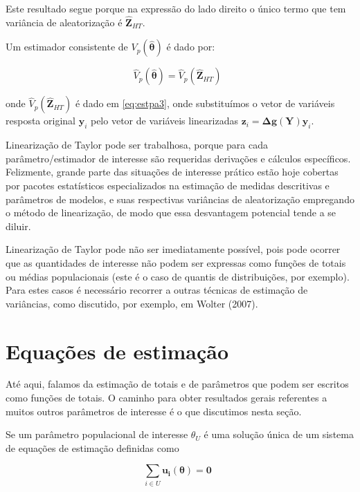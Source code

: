 \documentclass[
  12pt,
  brazilian,
]{book}
\theoremstyle{definition}
\theoremstyle{definition}
\theoremstyle{definition}
\theoremstyle{definition}
\theoremstyle{remark}
\begin{document}
Este resultado segue porque na expressão do lado direito o único termo que tem variância de aleatorização é \(\mathbf{\widehat{Z}}_{HT}\).

Um estimador consistente de \(V_{p} \left( \mathbf{\widehat{\theta}}\right)\) é dado por:

\begin{equation}
\widehat{V}_{p} \left( \mathbf{\widehat{\theta}} \right) = \widehat{V}_{p} \left( \mathbf{\widehat{Z}}_{HT} \right)  \,\,\,  \label{eq:estpa20}
\end{equation}

onde \(\widehat{V}_{p}\left( \mathbf{\widehat{Z}}_{HT}\right)\) é dado em \eqref{eq:estpa3}, onde substituímos o vetor de variáveis resposta original \(\mathbf{y}_i\) pelo vetor de variáveis linearizadas \(\mathbf{z}_{i} = \mathbf{\Delta g(Y)} \mathbf{y}_{i}\).

Linearização de Taylor pode ser trabalhosa, porque para cada parâmetro/estimador de interesse são requeridas derivações e cálculos específicos. Felizmente, grande parte das situações de interesse prático estão hoje cobertas por pacotes estatísticos especializados na estimação de medidas descritivas e parâmetros de modelos, e suas respectivas variâncias de aleatorização empregando o método de linearização, de modo que essa desvantagem potencial tende a se diluir.

Linearização de Taylor pode não ser imediatamente possível, pois pode ocorrer que as quantidades de interesse não podem ser expressas como funções de totais ou médias populacionais (este é o caso de quantis de distribuições, por exemplo). Para estes casos é necessário recorrer a outras técnicas de estimação de variâncias, como discutido, por exemplo, em Wolter (2007).

\hypertarget{equauxe7uxf5es-de-estimauxe7uxe3o}{%
\section{Equações de estimação}\label{equauxe7uxf5es-de-estimauxe7uxe3o}}

Até aqui, falamos da estimação de totais e de parâmetros que podem ser escritos como funções de totais. O caminho para obter resultados gerais referentes a muitos outros parâmetros de interesse é o que discutimos nesta seção.

Se um parâmetro populacional de interesse \(\theta_U\) é uma solução única de um sistema de equações de estimação definidas como

\begin{equation}
\sum_{i \in U} \mathbf{u_i(\theta)} = \mathbf{0}  \,\,\, \label{eq:estpa21}
\end{equation}
\end{document}
